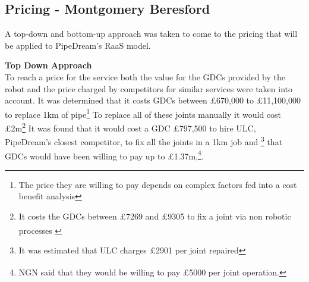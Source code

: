 \documentclass[11pt]{article}		%
\newcommand{\supercite}[1]{\textsuperscript{\cite{#1}}}		%
\begin{document}
            \subsection[Pricing]{Pricing - Montgomery Beresford} \label{revenue_model}\label{pricing}
                    
                A top-down and bottom-up approach was taken to come to the pricing that will be applied to PipeDream's RaaS model.
                    
            	\textbf{Top Down Approach}
            	\\
                To reach a price for the service both the value for the GDCs provided by the robot and the price charged by competitors for similar services were taken into account. 
                It was determined that it costs GDCs between £670,000 to £11,100,000 to replace 1km of pipe\supercite{SGN_Scotland}\footnote{The price they are willing to pay depends on complex factors fed into a cost benefit analysis} To replace all of these joints manually it would cost £2m\footnote{It costs the GDCs between £7269 and £9305 to fix a joint via non robotic processes \supercite{NYT}}
	            It was found that it would cost a GDC £797,500 to hire ULC,\supercite{NYT} PipeDream's closest competitor, to fix all the joints in a 1km job and \footnote{It was estimated that ULC charges £2901 per joint repaired} that GDCs would have been willing to pay up to £1.37m,\footnote{NGN said that they would be willing to pay £5000 per joint operation.\supercite{NGN}}.
	            \\
\end{document}
